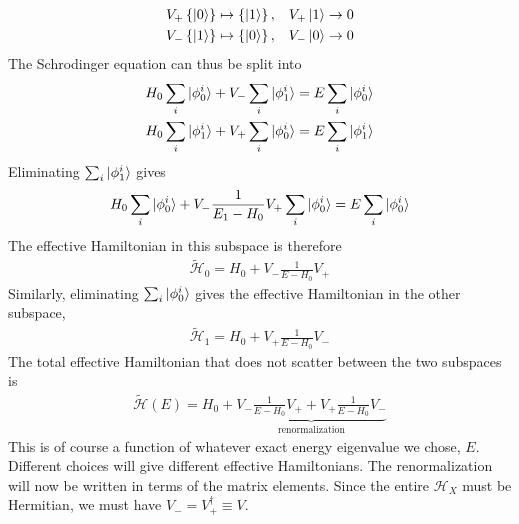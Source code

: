 \documentclass[twoside,11pt]{report}
\numberwithin{equation}{section}
\begin{document}
\begin{equation}\begin{aligned}
V_+ \left\{\ket{0}\right\} \mapsto \left\{\ket{1}\right\},&& V_+ \ket{1} \to 0\\
V_- \left\{\ket{1}\right\} \mapsto \left\{\ket{0}\right\},&& V_- \ket{0} \to 0
\end{aligned}\end{equation}
The Schrodinger equation can thus be split into
\begin{equation}\begin{aligned}
H_0 \sum_i \ket{\phi^i_0} + V_-\sum_i \ket{\phi^i_1} &= E \sum_i \ket{\phi^i_0}\\
H_0 \sum_i \ket{\phi^i_1} + V_+\sum_i \ket{\phi^i_0} &= E \sum_i \ket{\phi^i_1}\\
\end{aligned}\end{equation}
Eliminating \(\sum_i \ket{\phi^i_1}\) gives
\begin{equation}\begin{aligned}
H_0 \sum_i \ket{\phi^i_0} + V_-\frac{1}{E_1 - H_0}V_+\sum_i \ket{\phi^i_0} &= E \sum_i \ket{\phi^i_0}\\
\end{aligned}\end{equation}
The effective Hamiltonian in this subspace is therefore
\begin{equation}\begin{aligned}
	\tilde{\mathcal{H}}_0 = H_0 + V_-\frac{1}{E - H_0}V_+
\end{aligned}\end{equation}
Similarly, eliminating \(\sum_i \ket{\phi^i_0}\) gives the effective Hamiltonian in the other subspace,
\begin{equation}\begin{aligned}
	\tilde{\mathcal{H}}_1 = H_0 + V_+\frac{1}{E - H_0}V_-
\end{aligned}\end{equation}
The total effective Hamiltonian that does not scatter between the two subspaces is
\begin{equation}\begin{aligned}
	\tilde{\mathcal{H}}(E) = H_0 + \underbrace{V_-\frac{1}{E - H_0}V_+ +  V_+\frac{1}{E - H_0}V_-}_\text{renormalization}
\end{aligned}\end{equation}
This is of course a function of whatever exact energy eigenvalue we chose, \(E\). Different choices will give different effective Hamiltonians. The renormalization will now be written in terms of the matrix elements. Since the entire \(\mathcal{H}_X\) must be Hermitian, we must have \(V_- = V_+^\dagger \equiv V\).
\end{document}
